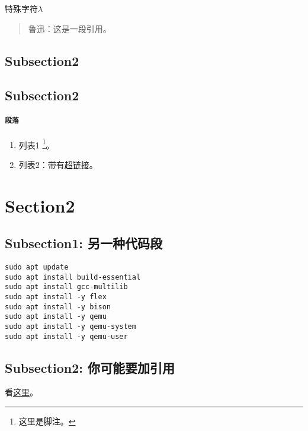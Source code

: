 \documentclass{article}
\begin{document}
特殊字符$\lambda$


\begin{quote}
    鲁迅：这是一段引用。
\end{quote}

\subsection{Subsection2}
\zhlipsum[1]

\subsection{Subsection2}

\paragraph{\texttt{段落}} \zhlipsum[1]

\begin{enumerate}
    \item 列表1 \footnote{这里是脚注。}。
    \item 列表2：带有\href{https://www.runoob.com/}{超链接}。
\end{enumerate}


\section{Section2}

\subsection{Subsection1: 另一种代码段}

\begin{lstlisting}
sudo apt update
sudo apt install build-essential
sudo apt install gcc-multilib
sudo apt install -y flex
sudo apt install -y bison
sudo apt install -y qemu
sudo apt install -y qemu-system
sudo apt install -y qemu-user
\end{lstlisting}

\subsection{Subsection2: 你可能要加引用}

看\href{https://www.overleaf.com/learn/latex/bibliography_management_with_bibtex}{这里}。
\end{document}
